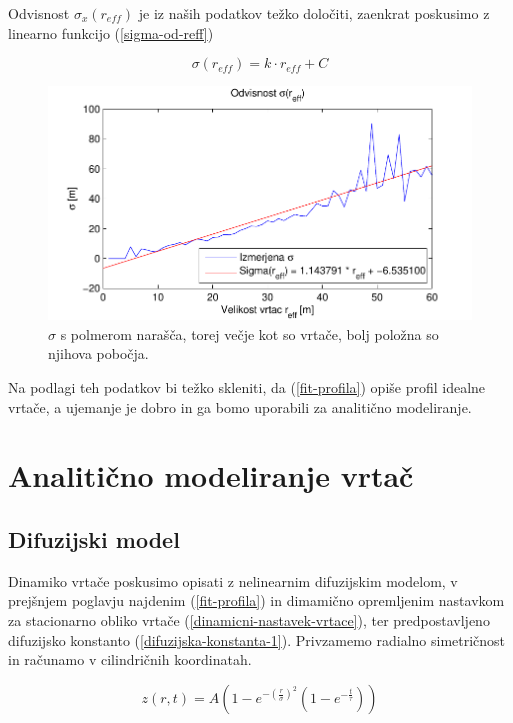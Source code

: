 \documentclass[a4paper, oneside, 12pt]{book}
\begin{document}
Odvisnost $\sigma_x(r_{eff})$ je iz naših podatkov težko določiti, zaenkrat poskusimo z linearno funkcijo (\ref{sigma-od-reff})


\begin{equation}
  \sigma (r_{eff}) = k \cdot r_{eff} + C
  \label{sigma-od-reff}
\end{equation}

\begin{figure}[H]
  \centering
  \includegraphics{slike/menisija-sigme}
  \caption{$\sigma$ s polmerom narašča, torej večje kot so vrtače, bolj položna so njihova pobočja.}
  \label{fig:menisija-sigma}
\end{figure}

Na podlagi teh podatkov bi težko skleniti, da (\ref{fit-profila}) opiše profil idealne vrtače, a ujemanje je dobro in ga bomo uporabili za analitično modeliranje. 


\chapter{Analitično modeliranje vrtač}
\label{analiticno-modeliranje}

\section{Difuzijski model}

Dinamiko vrtače poskusimo opisati z nelinearnim difuzijskim modelom, v prejšnjem poglavju najdenim (\ref{fit-profila}) in dimamično opremljenim nastavkom za stacionarno obliko vrtače (\ref{dinamicni-nastavek-vrtace}), ter  predpostavljeno difuzijsko konstanto (\ref{difuzijska-konstanta-1}). Privzamemo radialno simetričnost in računamo v cilindričnih koordinatah.

\begin{equation}
  z(r,t) = A\left(1-e^{-\left(\frac{r}{\sigma }\right)^2}\left(1-e^{-\frac{t}{\tau }}\right)\right)
  \label{dinamicni-nastavek-vrtace}
\end{equation}
\end{document}

